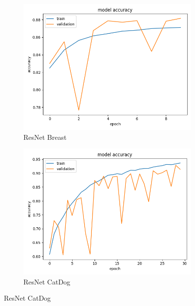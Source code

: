 \begin{figure}
\begin{subfigure}[b]{.45\linewidth}
\includegraphics[width=\linewidth]{Figs/resnet_breast_acc.jpg}
\caption{ResNet Breast}
\end{subfigure}
\begin{subfigure}[b]{.45\linewidth}
\includegraphics[width=\linewidth]{Figs/resnet_catdog_acc.jpg}
\caption{ResNet CatDog}
\end{subfigure}


\end{figure}
